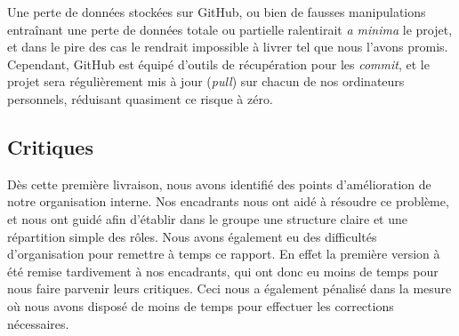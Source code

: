     Une perte de données stockées sur GitHub, ou bien de fausses manipulations entraînant une perte de données totale ou partielle ralentirait \textit{a minima} le projet, et dans le pire des cas le rendrait impossible à livrer tel que nous l'avons promis. Cependant, GitHub est équipé d'outils de récupération pour les \textit{commit}, et le projet sera régulièrement mis à jour (\textit{pull}) sur chacun de nos ordinateurs personnels, réduisant quasiment ce risque à zéro.

	\subsection{Critiques}
		Dès cette première livraison, nous avons identifié des points d'amélioration de notre organisation interne. Nos encadrants nous ont aidé à résoudre ce problème, et nous ont guidé afin d'établir dans le groupe une structure claire et une répartition simple des rôles.
		Nous avons également eu des difficultés d'organisation pour remettre à temps ce rapport. En effet la première version à été remise tardivement à nos encadrants, qui ont donc eu moins de temps pour nous faire parvenir leurs critiques. Ceci nous a également pénalisé dans la mesure où nous avons disposé de moins de temps pour effectuer les corrections nécessaires. 


